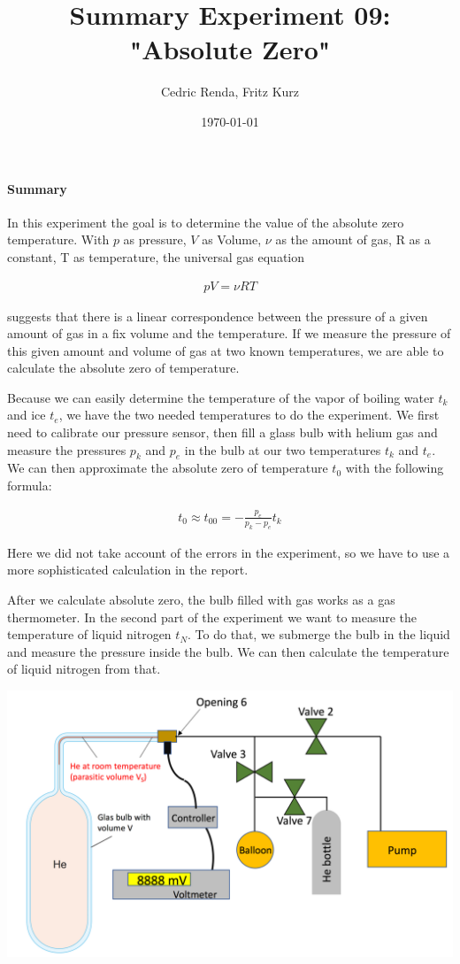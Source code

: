 \documentclass[12pt,a4paper]{article}
\title{Summary Experiment 09: "Absolute Zero"}
\author{Cedric Renda, Fritz Kurz}
\date{\today }
\begin{document}
	\maketitle

	\paragraph{Summary}
		In this experiment the goal is to determine the value of the absolute zero temperature. With $p$ as pressure, $V$ as Volume, $\nu$ as the amount of gas, R as a constant, T as temperature, the universal gas equation
		
			\begin{align}
				pV = \nu RT
			\end{align}
	
		 suggests that there is a linear correspondence between the pressure of a given amount of gas in a fix volume and the temperature. If we measure the pressure of this given amount and volume of gas at two known temperatures, we are able to calculate the absolute zero of temperature. 
		 
		 Because we can easily determine the temperature of the vapor of boiling water $t_k$ and ice $t_e$, we have the two needed temperatures to do the experiment. We first need to calibrate our pressure sensor, then fill a glass bulb with helium gas and measure the pressures $p_k$ and $p_e$ in the bulb at our two temperatures $t_k$ and $t_e$. We can then approximate the absolute zero of temperature $t_0$ with the following formula:
		 	
		 	\begin{align}
		 		t_0 \approx t_{00} = -\frac{p_e}{p_k - p_e}t_k
		 	\end{align}
	 	
		Here we did not take account of the errors in the experiment, so we have to use a more sophisticated calculation in the report. 
		
		After we calculate absolute zero, the bulb filled with gas works as a gas thermometer. In the second part of the experiment we want to measure the temperature of liquid nitrogen $t_N$. To do that, we submerge the bulb in the liquid and measure the pressure inside the bulb. We can then calculate the temperature of liquid nitrogen from that. 
		
		\includegraphics[width=\textwidth]{schematic.png}
\end{document}
